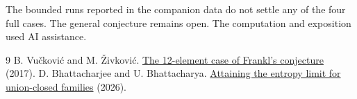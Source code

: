 \documentclass[10pt]{article}
\begin{document}
The bounded runs reported in the companion data do not settle any
of the four full cases. The general conjecture remains open.
The computation and exposition used AI assistance.

\begin{thebibliography}{9}
 B. Vu\v{c}kovi\'c and M. \v{Z}ivkovi\'c.
\href{https://ipsitransactions.org/journals/papers/tir/2017jan/fullPaper.pdf}
{The 12-element case of Frankl's conjecture} (2017).
 D. Bhattacharjee and U. Bhattacharya.
\href{https://zenodo.org/records/23645724}
{Attaining the entropy limit for union-closed families} (2026).
\end{thebibliography}
\end{document}
